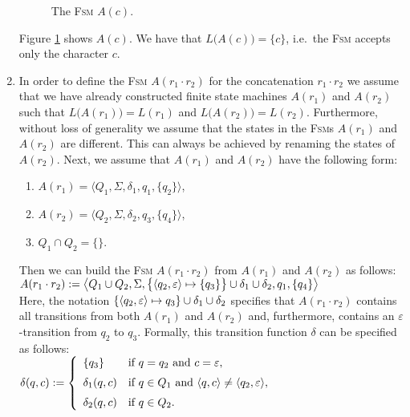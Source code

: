 \begin{enumerate}
      \begin{figure}[!ht]
        \centering
      \caption{The \textsc{Fsm} $A(c)$.}
      \label{fig:aChar.eps}
      \end{figure}
      Figure \ref{fig:aChar.eps} shows $A(c)$.
      We have that $L\bigl(A(c)\bigr) = \{c\}$, i.e.~the \textsc{Fsm} accepts only the character $c$. 
\item In order to define the \textsc{Fsm} $A(r_1 \cdot r_2)$ for the concatenation $r_1 \cdot r_2$ 
      we assume that we have already constructed finite state machines $A(r_1)$ and $A(r_2)$
      such that $L\bigl(A(r_1)\bigr) = L(r_1)$ and $L\bigl(A(r_2)\bigr) = L(r_2)$.  Furthermore,
      without loss of generality we assume that the states in the \textsc{Fsm}s  $A(r_1)$ and $A(r_2)$ are different. 
      This can always be achieved by renaming the states of $A(r_2)$.
      Next, we assume that $A(r_1)$ and $A(r_2)$ have the following form:
      \begin{enumerate}
      \item $A(r_1) = \bigl\langle Q_1, \Sigma, \delta_1, q_1, \{ q_2 \}\bigr\rangle$,
      \item $A(r_2) = \bigl\langle Q_2, \Sigma, \delta_2, q_3, \{ q_4 \}\bigr\rangle$,
      \item $Q_1 \cap Q_2 = \{\}$.
      \end{enumerate}
      Then we can build the \textsc{Fsm} $A(r_1 \cdot r_2)$ from $A(r_1)$ and $A(r_2)$ as follows:
      \\[0.2cm]
      \hspace*{0.8cm}
       $A(r_1 \cdot r_2) := \bigl\langle Q_1 \cup Q_2, \Sigma, 
                \bigl\{ \pair(q_2,\varepsilon) \mapsto \{q_3\} \bigr\} 
                   \cup \delta_1 \cup \delta_2, q_1, \{ q_4 \} \bigr\rangle$
      \\[0.2cm]
      Here, the notation $\{ \pair(q_2,\varepsilon) \mapsto q_3 \} \cup \delta_1 \cup \delta_2$ specifies that
      $A(r_1 \cdot r_2)$ contains all transitions from both $A(r_1)$ and $A(r_2)$ and, furthermore,
      contains an $\varepsilon$-transition from $q_2$ to $q_3$.     
      Formally, this transition function  $\delta$ can be specified as follows:
      \\[0.2cm]
      \hspace*{1.3cm}
      $\delta(q,c) := \left\{
      \begin{array}{ll}
        \{ q_3 \}       & \mbox{if $q = q_2$ and $c = \varepsilon$}, \\[0.2cm]
        \delta_1(q, c)  & \mbox{if $q \in Q_1$ and $\pair(q,c) \not= \pair(q_2,\varepsilon)$}, \\[0.2cm]
        \delta_2(q, c)  & \mbox{if $q \in Q_2$.} 
      \end{array}\right.
      $
      \\[0.2cm]



\end{enumerate}
